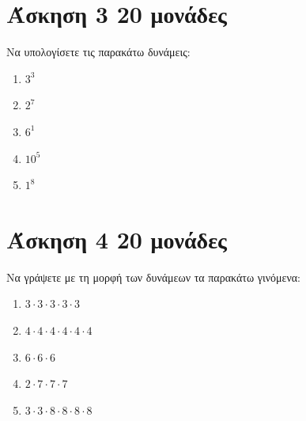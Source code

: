 \documentclass[a4paper,10pt]{report}
\begin{document}
\section*{Άσκηση 3  \hfill \small{}20  μονάδες}
Να υπολογίσετε τις παρακάτω δυνάμεις:
\begin{enumerate}[1)]
 \item $3^{3}$
 \item $2^{7}$
 \item $6^{1}$
 \item $10^{5}$
 \item $1^{8}$
\end{enumerate}




\section*{Άσκηση 4  \hfill \small{} 20 μονάδες}
Να γράψετε με τη μορφή των δυνάμεων τα παρακάτω γινόμενα:
\begin{enumerate}[1)]
 \item $3\cdot 3\cdot 3\cdot 3\cdot 3$
 \item $4\cdot 4\cdot 4\cdot 4\cdot 4\cdot 4$
 \item $6\cdot 6\cdot 6$
 \item $2\cdot 7\cdot 7\cdot 7$
 \item $3\cdot 3\cdot 8\cdot 8\cdot 8\cdot 8$
\end{enumerate}
 
\end{document}
